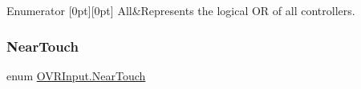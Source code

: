 \begin{DoxyEnumFields}{Enumerator}
[0pt][0pt]{}\mbox{\label{class_o_v_r_input_a5c86f9052a9cbb0b73779ff5704d60a8ab1c94ca2fbc3e78fc30069c8d0f01680}} 
All&Represents the logical OR of all controllers. \\
\hline

\end{DoxyEnumFields}
\mbox{\label{class_o_v_r_input_afa31aa573064be9bab8fc9e58cddeab6}} 
\subsubsection{\texorpdfstring{Near\+Touch}{NearTouch}}
{\footnotesize\ttfamily enum \mbox{\hyperlink{class_o_v_r_input_afa31aa573064be9bab8fc9e58cddeab6}{O\+V\+R\+Input.\+Near\+Touch}}\hspace{0.3cm}{\ttfamily [strong]}}

